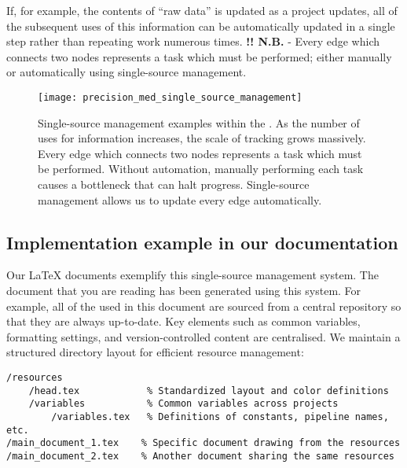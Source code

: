 If, for example, the contents of ``raw data'' is updated as a project updates, all of the subsequent uses of this information can be automatically updated in a single step rather than repeating work numerous times. 
\textbf{!! N.B. } - Every edge which connects two nodes represents a task which must be performed; either manually or automatically using single-source management. 

\begin{figure}[h] \hspace*{0cm} 
\begin{center}
	\texttt{[image: precision\_med\_single\_source\_management]}
	\caption{Single-source management examples within the \pmu. As the number of uses for information increases, the scale of tracking grows massively.  Every edge which connects two nodes represents a task which must be performed. Without automation, manually performing each task causes a bottleneck that can halt progress. 
	Single-source management allows us to update every edge automatically.}
	\label{fig:precision_med_single_source_management}
\end{center}
\end{figure}



\subsection{Implementation example in our documentation}

Our LaTeX documents exemplify this single-source management system. 
The document that you are reading has been generated using this system. 
For example, all of the  used in this document are sourced from a central repository so that they are always up-to-date.
Key elements such as common variables, formatting settings, and version-controlled content are centralised. 
We maintain a structured directory layout for efficient resource management:

\begin{verbatim}
/resources
    /head.tex            % Standardized layout and color definitions
    /variables           % Common variables across projects
        /variables.tex   % Definitions of constants, pipeline names, etc.
/main_document_1.tex    % Specific document drawing from the resources
/main_document_2.tex    % Another document sharing the same resources
\end{verbatim}

